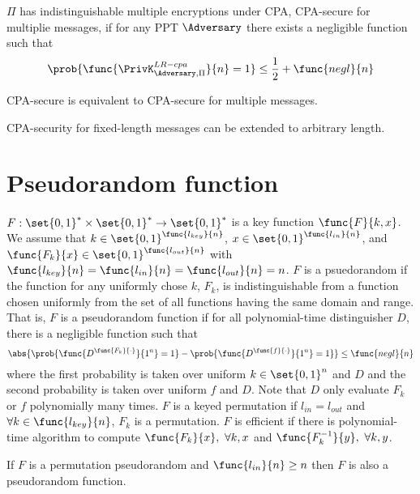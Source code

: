 \(\Pi\) has indistinguishable multiple encryptions under CPA, CPA-secure for multiplie messages, if for any PPT \(\Adversary\) there exists a negligible function such that 
\begin{equation*}
    \prob{\func{\PrivK_{\Adversary,\Pi}^{LR-cpa}}{n} = 1} \leq \frac{1}{2} + \func{negl}{n}
\end{equation*}

\begin{theorem}
    CPA-secure is equivalent to CPA-secure for multiple messages.
\end{theorem}

\begin{corollary}
    CPA-security for fixed-length messages can be extended to arbitrary length.
\end{corollary}

\section{Pseudorandom function}
\(F: \set{0,1}^{\ast} \times \set{0,1}^{\ast} \to \set{0,1}^{\ast}\) is a key function \(\func{F}{k,x}\). We assume that \(k \in \set{0,1}^{\func{l_{key}}{n}}\), \(x \in \set{0,1}^{\func{l_{in}}{n}}\), and \(\func{F_k}{x} \in \set{0,1}^{\func{l_{out}}{n}}\) with \(\func{l_{key}}{n} = \func{l_{in}}{n} = \func{l_{out}}{n} = n\). \(F\) is a psuedorandom if the function for any uniformly chose \(k\), \(F_k\), is indistinguishable from a function chosen uniformly from the set of all functions having the same domain and range. That is, \(F\) is a pseudorandom function if for all polynomial-time distinguisher \(D\), there is a negligible function such that 
\begin{equation*}
    \abs{\prob{\func{D^{\func{F_k}{\cdot}}}{1^n} = 1} - \prob{\func{D^{\func{f}{\cdot}}}{1^n} = 1}} \leq \func{negl}{n}
\end{equation*}
where the first probability is taken over uniform \(k \in \set{0,1}^n\) and \(D\) and the second probability is taken over uniform \(f\) and \(D\). Note that \(D\) only evaluate \(F_k\) or \(f\) polynomially many times. \(F\) is a keyed permutation if \(l_{in} = l_{out}\) and \(\forall k \in \func{l_{key}}{n}\), \(F_k\) is a permutation. \(F\) is efficient if there is polynomial-time algorithm to compute \(\func{F_k}{x}, \ \forall k,x\) and \(\func{F^{-1}_k}{y}, \ \forall k,y\). 

\begin{proposition}
    If \(F\) is a permutation pseudorandom and \(\func{l_{in}}{n} \geq n\) then \(F\) is also a pseudorandom function.
\end{proposition}

